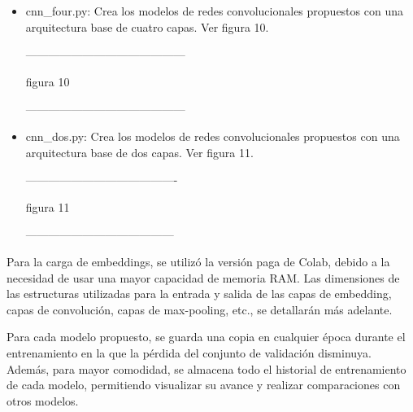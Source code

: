 \begin{itemize}
\item cnn\_four.py: Crea los modelos de redes convolucionales propuestos con una arquitectura base de cuatro capas. Ver figura 10.

------------------------------------------

figura 10

------------------------------------------

\item cnn\_dos.py: Crea los modelos de redes convolucionales propuestos con una arquitectura base de dos capas. Ver figura 11.

----------------------------------------

figura 11

---------------------------------------
\end{itemize}

Para la carga de embeddings, se utilizó la versión paga de Colab, debido a la necesidad de usar una mayor capacidad de memoria RAM. Las dimensiones de las estructuras utilizadas para la entrada y salida de las capas de embedding, capas de convolución, capas de max-pooling, etc., se detallarán más adelante.

Para cada modelo propuesto, se guarda una copia en cualquier época durante el entrenamiento en la que la pérdida del conjunto de validación disminuya. Además, para mayor comodidad, se almacena todo el historial de entrenamiento de cada modelo, permitiendo visualizar su avance y realizar comparaciones con otros modelos.
